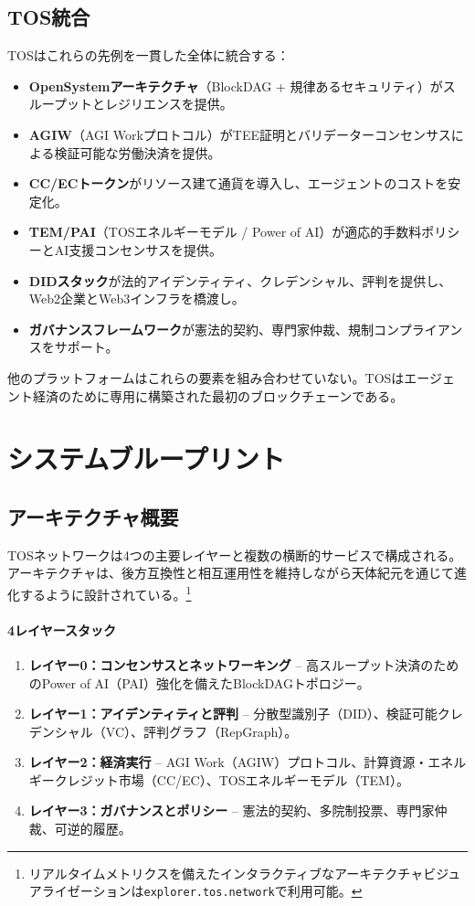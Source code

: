 \documentclass[11pt]{article}
\begin{document}
\subsection{TOS統合}
TOSはこれらの先例を一貫した全体に統合する：
\begin{itemize}[noitemsep]
  \item \textbf{OpenSystemアーキテクチャ}（BlockDAG + 規律あるセキュリティ）がスループットとレジリエンスを提供。
  \item \textbf{AGIW}（AGI Workプロトコル）がTEE証明とバリデーターコンセンサスによる検証可能な労働決済を提供。
  \item \textbf{CC/ECトークン}がリソース建て通貨を導入し、エージェントのコストを安定化。
  \item \textbf{TEM/PAI}（TOSエネルギーモデル / Power of AI）が適応的手数料ポリシーとAI支援コンセンサスを提供。
  \item \textbf{DIDスタック}が法的アイデンティティ、クレデンシャル、評判を提供し、Web2企業とWeb3インフラを橋渡し。
  \item \textbf{ガバナンスフレームワーク}が憲法的契約、専門家仲裁、規制コンプライアンスをサポート。
\end{itemize}

他のプラットフォームはこれらの要素を組み合わせていない。TOSはエージェント経済のために専用に構築された最初のブロックチェーンである。

\section{システムブループリント}
\subsection{アーキテクチャ概要}
TOSネットワークは4つの主要レイヤーと複数の横断的サービスで構成される。アーキテクチャは、後方互換性と相互運用性を維持しながら天体紀元を通じて進化するように設計されている。\footnote{リアルタイムメトリクスを備えたインタラクティブなアーキテクチャビジュアライゼーションは\texttt{explorer.tos.network}で利用可能。}

\paragraph{4レイヤースタック}
\begin{enumerate}[noitemsep]
  \item \textbf{レイヤー0：コンセンサスとネットワーキング} -- 高スループット決済のためのPower of AI（PAI）強化を備えたBlockDAGトポロジー。
  \item \textbf{レイヤー1：アイデンティティと評判} -- 分散型識別子（DID）、検証可能クレデンシャル（VC）、評判グラフ（RepGraph）。
  \item \textbf{レイヤー2：経済実行} -- AGI Work（AGIW）プロトコル、計算資源・エネルギークレジット市場（CC/EC）、TOSエネルギーモデル（TEM）。
  \item \textbf{レイヤー3：ガバナンスとポリシー} -- 憲法的契約、多院制投票、専門家仲裁、可逆的履歴。
\end{enumerate}
\end{document}
